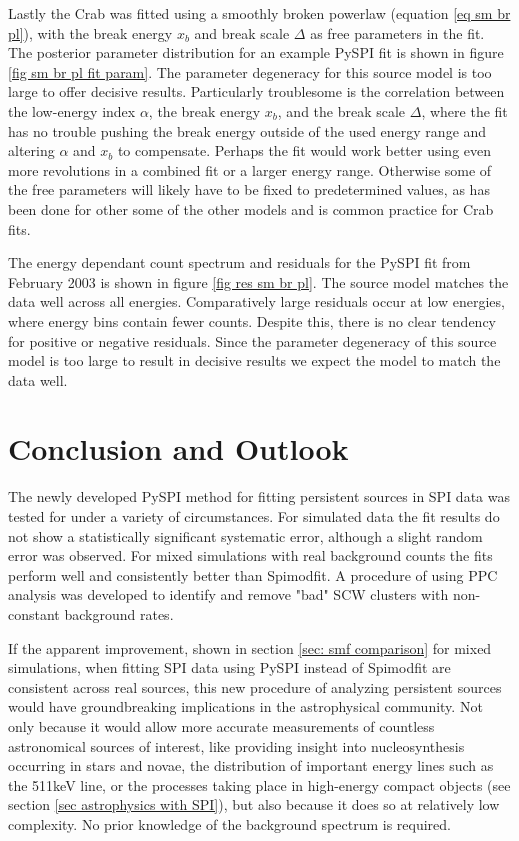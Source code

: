 \documentclass{report}
\begin{document}
Lastly the Crab was fitted using a smoothly broken powerlaw (equation \ref{eq sm br pl}), with the break energy $x_b$ and break scale $\Delta$ as free parameters in the fit. The posterior parameter distribution for an example PySPI fit is shown in figure \ref{fig sm br pl fit param}. The parameter degeneracy for this source model is too large to offer decisive results. Particularly troublesome is the correlation between the low-energy index $\alpha$, the break energy $x_b$, and the break scale $\Delta$, where the fit has no trouble pushing the break energy outside of the used energy range and altering $\alpha$ and $x_b$ to compensate. Perhaps the fit would work better using even more revolutions in a combined fit or a larger energy range. Otherwise some of the free parameters will likely have to be fixed to predetermined values, as has been done for other some of the other models and is common practice for Crab fits. 

The energy dependant count spectrum and residuals for the PySPI fit from February 2003 is shown in figure \ref{fig res sm br pl}. The source model matches the data well across all energies. Comparatively large residuals occur at low energies, where energy bins contain fewer counts. Despite this, there is no clear tendency for positive or negative residuals. Since the parameter degeneracy of this source model is too large to result in decisive results we expect the model to match the data well. 

\chapter{Conclusion and Outlook}
The newly developed PySPI method for fitting persistent sources in SPI data was tested for under a variety of circumstances. For simulated data the fit results do not show a statistically significant systematic error, although a slight random error was observed. For mixed simulations with real background counts the fits perform well and consistently better than Spimodfit. A procedure of using PPC analysis was developed to identify and remove "bad" SCW clusters with non-constant background rates. 

If the apparent improvement, shown in section \ref{sec: smf comparison} for mixed simulations, when fitting SPI data using PySPI instead of Spimodfit are consistent across real sources, this new procedure of analyzing persistent sources would have groundbreaking implications in the astrophysical community. Not only because it would allow more accurate measurements of countless astronomical sources of interest, like providing insight into nucleosynthesis occurring in stars and novae, the distribution of important energy lines such as the 511keV line, or the processes taking place in high-energy compact objects (see section \ref{sec astrophysics with SPI}), but also because it does so at relatively low complexity. No prior knowledge of the background spectrum is required. 
\end{document}
